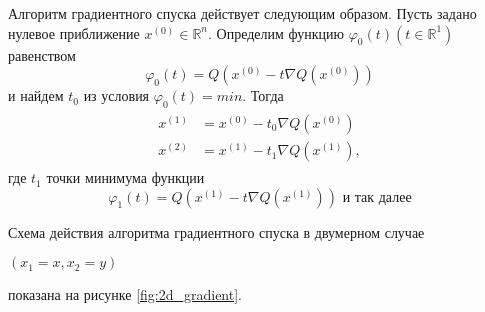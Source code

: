 Алгоритм градиентного спуска действует следующим образом. Пусть задано нулевое приближение $x^{(0)} \in \mathbb{R}^n$. Определим функцию $\varphi_0(t) (t \in \mathbb{R}^1)$ равенством
\begin{equation} \label{eq:8.7}
	\varphi_0(t) = Q(x^{(0)} - t\nabla Q(x^{(0)})) 
\end{equation}
и найдем $t_0$ из условия $\varphi_0(t) = min$. Тогда
\begin{align}
	\begin{split} \label{eq:8.8}
		x^{(1)} &= x^{(0)} - t_0\nabla Q(x^{(0)}) \\
		x^{(2)} &= x^{(1)} - t_1\nabla Q(x^{(1)}),
	\end{split}
\end{align}
где $t_1$ точки минимума функции
\begin{equation} \label{eq:8.9}
	\varphi_1(t) = Q(x^{(1)} - t\nabla Q(x^{(1)})) \textrm{ и так далее}
\end{equation}

Схема действия алгоритма градиентного спуска в двумерном случае \parbox{29mm}{$(x_1 = x, x_2 = y)$} показана на рисунке \ref{fig:2d_gradient}.


